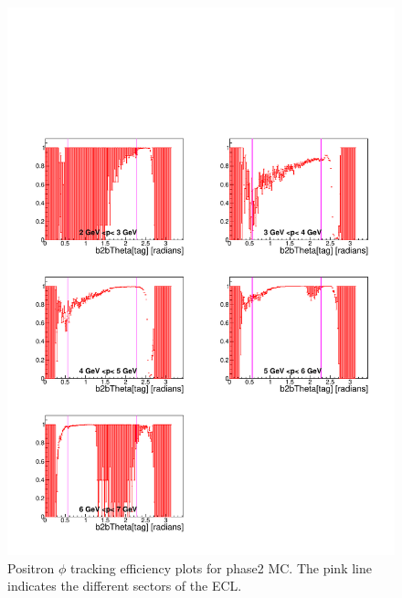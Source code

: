 \documentclass[a4paper,11pt,twosided,final,german,openbib,pdftex,listof=totoc,bibliography=totoc]{scrbook}
\begin{document}
\begin{appendix}
\begin{figure}[!htbp]
	\centering
	\includegraphics[width=\textwidth]{Plots/master/xPMThetaep_MC}
	\caption[Momentum $\theta$ Positron Efficiency Phase2 MC]{Positron $\phi$ tracking efficiency plots for phase2 MC. The pink line indicates the different sectors of the ECL.}
	\label{plt:PMThetaep_MC}
\end{figure}



\end{appendix}
\end{document}
